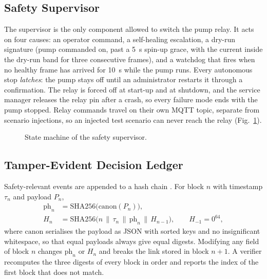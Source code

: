 \documentclass[11pt,a4paper]{article}
\begin{document}
\subsection{Safety Supervisor}

The supervisor is the only component allowed to switch the pump relay. It acts on four causes: an operator command, a self-healing escalation, a dry-run signature (pump commanded on, past a 5~s spin-up grace, with the current inside the dry-run band for three consecutive frames), and a watchdog that fires when no healthy frame has arrived for 10~s while the pump runs. Every autonomous stop \emph{latches}: the pump stays off until an administrator restarts it through a confirmation. The relay is forced off at start-up and at shutdown, and the service manager releases the relay pin after a crash, so every failure mode ends with the pump stopped. Relay commands travel on their own MQTT topic, separate from scenario injections, so an injected test scenario can never reach the relay (Fig.~\ref{fig:safety}).

\begin{figure}[H]
\centering
{}
\caption{State machine of the safety supervisor.}
\label{fig:safety}
\end{figure}

\subsection{Tamper-Evident Decision Ledger}

Safety-relevant events are appended to a hash chain \cite{haber1991timestamp}. For block $n$ with timestamp $\tau_n$ and payload $P_n$,
\begin{align}
\mathrm{ph}_n &= \mathrm{SHA256}\big(\mathrm{canon}(P_n)\big), \\
H_n &= \mathrm{SHA256}\big(n \,\|\, \tau_n \,\|\, \mathrm{ph}_n \,\|\, H_{n-1}\big), \qquad H_{-1} = 0^{64},
\end{align}
where $\mathrm{canon}$ serialises the payload as JSON with sorted keys and no insignificant whitespace, so that equal payloads always give equal digests. Modifying any field of block $n$ changes $\mathrm{ph}_n$ or $H_n$ and breaks the link stored in block $n+1$. A verifier recomputes the three digests of every block in order and reports the index of the first block that does not match.
\end{document}
